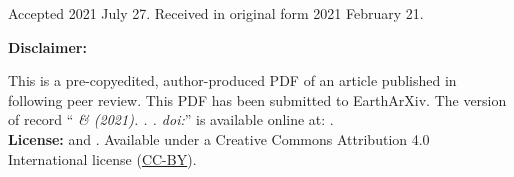\documentclass[twocolumn,10pt]{article}
\newcommand{\Author}{%
  \SolerShort{} \& \UiedaShort
}
\newcommand{\AuthorLong}{%
  \Soler{} and \Uieda
}
\newcommand{\AuthorAffil}{%
    {\large
      \Soler$^{1,2}$ \orcidlink{\SolerORCID} and
        \Uieda$^{3}$ \orcidlink{\UiedaORCID}
    }
    \\[0.4cm]
    {\small $^{1}$\CONICET (\SolerMail)} \\
    {\small $^{2}$\IGSV} \\
    {\small $^{3}$\Liverpool} \\
}
\begin{document}
\title{\Title}
\author{\AuthorAffil}
\date{
    \normalsize
    \today
}
\maketitle

Accepted 2021 July 27. Received in original form 2021 February 21.

\vspace{0.4cm}

\noindent
\textbf{Disclaimer:}

This is a pre-copyedited, author-produced PDF of an article
published in \textit{\Journal{}} following peer review.
This PDF has been submitted to EarthArXiv.
The version of record
``\textit{\Author{} (2021). \Title{}. \Journal{}. doi:\DOI{}}''
is available online at: \DOILink{}.
\\[0.5cm]
\noindent
\textbf{License:}
\textcopyright{} \the\year{} \AuthorLong{}.
Available under a Creative Commons Attribution 4.0 International license
(\href{https://creativecommons.org/licenses/by/4.0/}{CC-BY}).


\begin{abstract}
    
\end{abstract}











\end{document}
